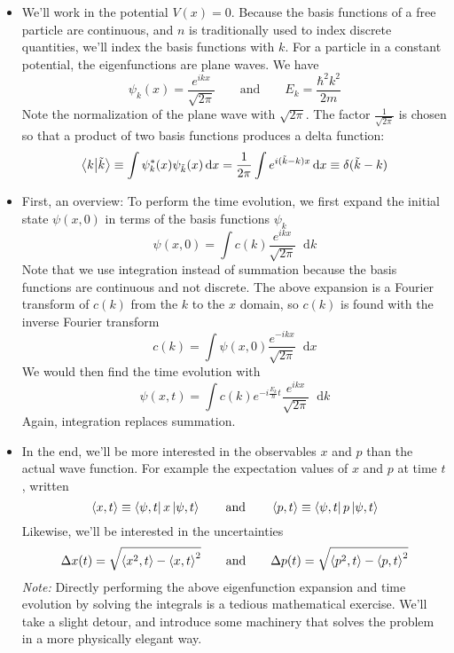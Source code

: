 \documentclass[11pt, a4paper]{article}
\newcommand{\diff}{\mathop{}\!\mathrm{d}} %
\newcommand{\eqtext}[1]{\qquad \text{#1} \qquad}
\begin{document}
\begin{itemize}
	\item We'll work in the potential $ V(x) = 0$. Because the basis functions of a free particle are continuous, and $ n $ is traditionally used to index discrete quantities, we'll index the basis functions with $ k $. For a particle in a constant potential, the eigenfunctions are plane waves. We have
	\begin{equation*}
		\psi_{k}(x) = \frac{e^{ikx}}{\sqrt{2\pi}} \eqtext{and} E_{k} = \frac{\hbar^{2}k^{2}}{2m}
	\end{equation*}
	Note the normalization of the plane wave with $ \sqrt{2\pi} $. The factor $ \frac{1}{\sqrt{2\pi}} $ is chosen so that a product of two basis functions produces a delta function:
	\begin{equation*}
		\braket{k}{\tilde{k}} \equiv \int \psi_{k}^{*}(x)\psi_{\tilde{k}}(x)\diff x = \frac{1}{2\pi} \int e^{i(\tilde{k}-k)x}\diff x \equiv \delta(\tilde{k} - k)
	\end{equation*}
	
	\item First, an overview: To perform the time evolution, we first expand the initial state $ \psi(x, 0) $ in terms of the basis functions $ \psi_{k} $
	\begin{equation*}
		\psi(x, 0) = \int  c(k)\frac{e^{ikx}}{\sqrt{2\pi}} \diff k
	\end{equation*}
	Note that we use integration instead of summation because the basis functions are continuous and not discrete. The above expansion is a Fourier transform of $ c(k) $ from the $ k $ to the $ x $ domain, so $ c(k) $ is found with the inverse Fourier transform
	\begin{equation*}
		c(k) = \int \psi(x, 0)\frac{e^{-ikx}}{\sqrt{2\pi}}\diff x 
	\end{equation*}
	We would then find the time evolution with
	\begin{equation*}
		\psi(x, t) = \int c(k)e^{-i\frac{E_{k}}{\hbar}t}\frac{e^{ikx}}{\sqrt{2\pi}} \diff k
	\end{equation*}
	Again, integration replaces summation.
	
	\item In the end, we'll be more interested in the observables $ x $ and $ p $ than the actual wave function. For example the expectation values of $ x $ and $ p $ at time $ t $, written
	\begin{equation*}
		\ev{x, t} \equiv \bra{\psi, t}x\ket{\psi, t} \eqtext{and} \ev{p, t} \equiv \bra{\psi, t}p\ket{\psi, t}
	\end{equation*}
	Likewise, we'll be interested in the uncertainties
	\begin{equation*}
		\Delta x(t) = \sqrt{\ev{x^{2}, t} - \ev{x, t}^{2}} \eqtext{and} \Delta p(t) = \sqrt{\ev{p^{2}, t} - \ev{p, t}^{2}}
	\end{equation*}
	\textit{Note:} Directly performing the above eigenfunction expansion and time evolution by solving the integrals is a tedious mathematical exercise. We'll take a slight detour, and introduce some machinery that solves the problem in a more physically elegant way.
\end{itemize}
\end{document}
